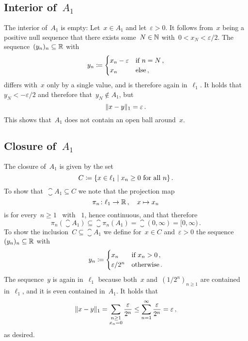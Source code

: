 \section{}





\subsection*{Interior of~$A_1$}

The interior of~$A_1$ is empty:
Let~$x \in A_1$ and let~$\varepsilon > 0$.
It follows from~$x$ being a positive null sequence that there exists some~$N \in \mathbb{N}$ with~$0 < x_N < \varepsilon/2$.
The sequence~$(y_n)_n \subseteq \mathbb{R}$ with
\[
            y_n
  \coloneqq  \begin{cases}
              x_n - \varepsilon & \text{if~$n = N$} \,, \\
              x_n               & \text{else} \,, \\
            \end{cases}
\]
differs with~$x$ only by a single value, and is therefore again in~$\ell_1$.
It holds that~$y_N < -\varepsilon/2$ and therefore that~$y_N \notin A_1$, but
\[
    \lVert x - y\rVert_1
  = \varepsilon \,.
\]
This shows that~$A_1$ does not contain an open ball around~$x$.





\subsection*{Closure of~$A_1$}

The closure of~$A_1$ is given by the set
\[
            C
  \defined  \{
              x \in \ell_1
            \suchthat
              \text{$x_n \geq 0$ for all~$n$}
            \} \,.
\]
To show that~$\closure{A_1} \subseteq C$ we note that the projection map
\[
          \pi_n
  \colon  \ell_1
  \to     \mathbb{R} \,,
  \quad   x
  \mapsto x_n
\]
is for every~$n \geq 1$~{\lipcont} with {\lipconst}~$1$, hence continuous, and that therefore
\[
            \pi_n(\closure{A_1})
  \subseteq \closure{ \pi_n(A_1) }
  =         \closure{ (0,\infty) }
  =         [0,\infty) \,.
\]
To show the inclusion~$C \subseteq \closure{A_1}$ we define for~$x \in C$ and~$\varepsilon > 0$ the sequence~$(y_n)_n \subseteq \mathbb{R}$ with
\[
            y_n
  \coloneqq  \begin{cases}
              x_n             & \text{if~$x_n > 0$} \,,  \\
              \varepsilon/2^n & \text{otherwise} \,.
            \end{cases}
\]
The sequence~$y$ is again in~$\ell_1$ because both~$x$ and~$(1/2^n)_{n \geq 1}$ are contained in~$\ell_1$, and it is even contained in~$A_1$.
It holds that
\[
        \lVert x - y \rVert_1
  =     \sum_{\substack{n \geq 1 \\ x_n = 0}} \frac{\varepsilon}{2^n}
  \leq  \sum_{n=1}^\infty \frac{\varepsilon}{2^n}
  =     \varepsilon \,,
\]
as desired.





